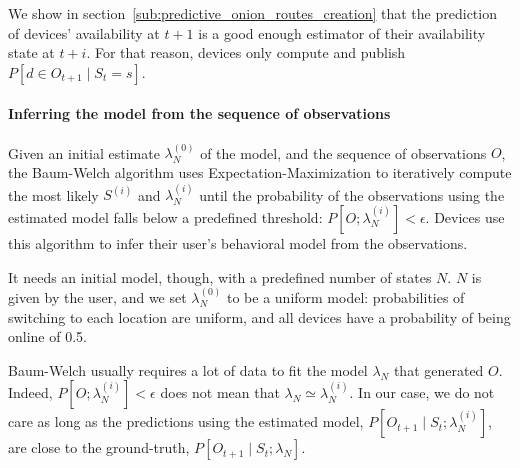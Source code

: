 We show in section~\ref{sub:predictive_onion_routes_creation} that the prediction of devices' availability at $t+1$ is a good enough estimator of their availability state at $t+i$.
For that reason, devices only compute and publish $P\left[ d \in O_{t+1} \mid S_{t} = s \right]$.

\paragraph*{Inferring the model from the sequence of observations}

Given an initial estimate $\lambda_{N}^{(0)}$ of the model, and the sequence of observations $O$, the Baum-Welch algorithm uses Expectation-Maximization to iteratively compute the most likely $S^{(i)}$ and $\lambda_{N}^{(i)}$ until the probability of the observations using the estimated model falls below a predefined threshold: $P[O; \lambda_{N}^{(i)}] < \epsilon$.
Devices use this algorithm to infer their user's behavioral model from the observations.

It needs an initial model, though, with a predefined number of states $N$. 
$N$ is given by the user, and we set $\lambda_{N}^{(0)}$ to be a uniform model: probabilities of switching to each location are uniform, and all devices have a probability of being online of 0.5.

Baum-Welch usually requires a lot of data to fit the model $\lambda_N$ that generated $O$.
Indeed, $P[O; \lambda_{N}^{(i)}] < \epsilon$ does not mean that $\lambda_N \simeq \lambda_N^{(i)}$.
In our case, we do not care as long as the predictions using the estimated model, $P[O_{t+1} \mid S_t; \lambda_N^{(i)}]$, are close to the ground-truth, $P[O_{t+1} \mid S_t; \lambda_N]$.
